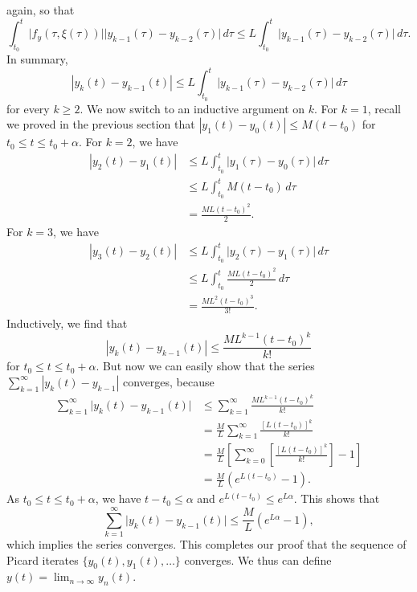 \documentclass{myart}
\begin{document}
again, so that
\begin{equation*}
       \int_{t_0}^t \Big|f_y(\tau, \xi(\tau))\Big|
                    \Big|y_{k-1}(\tau) - y_{k-2}(\tau)\Big| \,d\tau
\leq L \int_{t_0}^t \Big|y_{k-1}(\tau) - y_{k-2}(\tau)\Big| \,d\tau.
\end{equation*}
In summary,
\begin{equation*}
     |y_k(t) - y_{k-1}(t)|
\leq L \int_{t_0}^t \Big|y_{k-1}(\tau) - y_{k-2}(\tau)\Big| \,d\tau
\end{equation*}
for every $k \geq 2$. We now switch to an inductive argument on $k$.
For $k = 1$, recall we proved in the previous section that $|y_1(t) -
y_0(t)| \leq M(t - t_0)$ for $t_0 \leq t \leq t_0 + \alpha$. For $k =
2$, we have
\begin{align*}
      |y_2(t) - y_1(t)|
&\leq L \int_{t_0}^t \Big|y_1(\tau) - y_0(\tau)\Big| \,d\tau \\
&\leq L \int_{t_0}^t M(t - t_0) \,d\tau \\
&= \frac{ML(t - t_0)^2}{2}.
\end{align*}
For $k = 3$, we have
\begin{align*}
      |y_3(t) - y_2(t)|
&\leq L \int_{t_0}^t \Big|y_2(\tau) - y_1(\tau)\Big| \,d\tau \\
&\leq L \int_{t_0}^t \frac{ML(t - t_0)^2}{2} \,d\tau \\
&   = \frac{ML^2(t - t_0)^3}{3!}.
\end{align*}
Inductively, we find that
\begin{equation} \label{eq:bound}
|y_k(t) - y_{k-1}(t)| \leq \frac{ML^{k-1}(t - t_0)^k}{k!}
\end{equation}
for $t_0 \leq t \leq t_0 + \alpha$. But now we can easily show that
the series $\sum_{k=1}^\infty |y_k(t) - y_{k-1}|$ converges, because
\begin{align*}
\sum_{k=1}^\infty \Big|y_k(t) - y_{k-1}(t)\Big|
&\leq \sum_{k=1}^\infty \frac{ML^{k-1}(t - t_0)^k}{k!} \\
&   = \frac{M}{L} \sum_{k=1}^\infty \frac{[L(t - t_0)]^k}{k!} \\
&   = \frac{M}{L} \left[\sum_{k=0}^\infty
        \left[\frac{[L(t - t_0)]^k}{k!}\right] - 1\right] \\
&   = \frac{M}{L} \left(e^{L(t - t_0)} - 1\right).
\end{align*}
As $t_0 \leq t \leq t_0 + \alpha$, we have $t - t_0 \leq \alpha$ and
$e^{L(t - t_0)} \leq e^{L\alpha}$. This shows that
\begin{equation*}
     \sum_{k=1}^\infty \Big|y_k(t) - y_{k-1}(t)\Big|
\leq \frac{M}{L} \left(e^{L\alpha} - 1\right),
\end{equation*}
which implies the series converges. This completes our proof that the
sequence of Picard iterates $\{y_0(t), y_1(t), \ldots\}$ converges. We
thus can define $y(t) = \lim_{n \to \infty} y_n(t)$.
\end{document}
